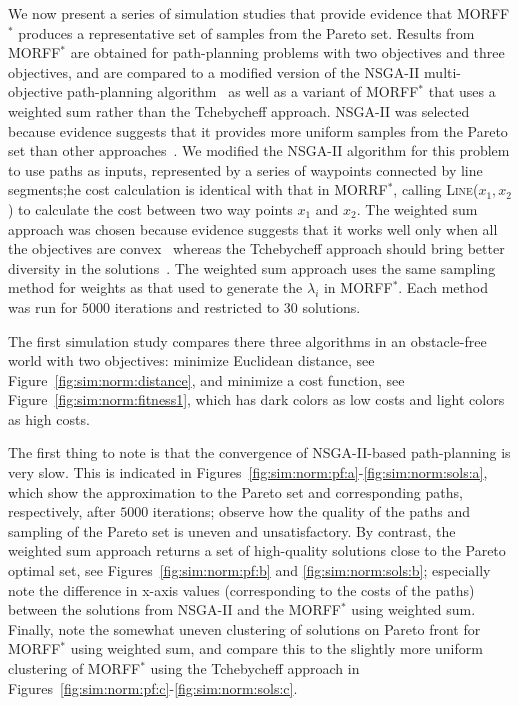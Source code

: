 \documentclass{article}
\begin{document}
We now present a series of simulation studies that provide evidence that MORFF$^{*}$ produces a representative set of samples from the Pareto set.
Results from MORFF$^{*}$ are obtained for path-planning problems with two objectives and three objectives, and are compared to a modified version of the NSGA-II multi-objective path-planning algorithm~\cite{Ahmed2013} as well as a variant of MORFF$^{*}$ that uses a weighted sum rather than the Tchebycheff approach.
NSGA-II was selected because evidence suggests that it provides more uniform samples from the Pareto set than other approaches~\cite{deb2002fast}.  
We modified the NSGA-II algorithm for this problem to use paths as inputs, represented by a series of waypoints connected by line segments;he cost calculation is identical with that in  MORRF$^{*}$, calling \textsc{Line}($ x_{1}, x_{2} $) to calculate the cost between two way points $ x_{1} $ and $ x_{2} $.  
The weighted sum approach was chosen because evidence suggests that it works well only when all the objectives are convex~\cite{4358754} whereas the Tchebycheff approach should bring better diversity in the solutions~\cite{4358754}.  
The weighted sum approach uses the same sampling method for weights as that used to generate the $\lambda_i$ in MORFF$^{*}$.
Each method was run for $ 5000 $ iterations and restricted to $ 30 $ solutions.  

The first simulation study compares there three algorithms in an obstacle-free world with two objectives: 
minimize Euclidean distance, see Figure~\ref{fig:sim:norm:distance}, and minimize a cost function, see Figure~\ref{fig:sim:norm:fitness1}, which has dark colors as low costs and light colors as high costs.  


The first thing to note is that the convergence of NSGA-II-based path-planning is very slow.
This is indicated in Figures~\ref{fig:sim:norm:pf:a}-\ref{fig:sim:norm:sols:a}, which show the approximation to the Pareto set and corresponding paths, respectively, after $5000$ iterations; observe how the quality of the paths and sampling of the Pareto set is uneven and unsatisfactory.
By contrast, the weighted sum approach returns a set of high-quality solutions close to the Pareto optimal set, see Figures~\ref{fig:sim:norm:pf:b} and \ref{fig:sim:norm:sols:b}; especially note the difference in x-axis values (corresponding to the costs of the paths) between the solutions from NSGA-II and the MORFF$^{*}$ using weighted sum.
Finally, note the somewhat uneven clustering of solutions on Pareto front for MORFF$^{*}$ using weighted sum, and compare this to the slightly more uniform clustering of MORFF$^{*}$ using the Tchebycheff approach in Figures~\ref{fig:sim:norm:pf:c}-\ref{fig:sim:norm:sols:c}.
\end{document}
